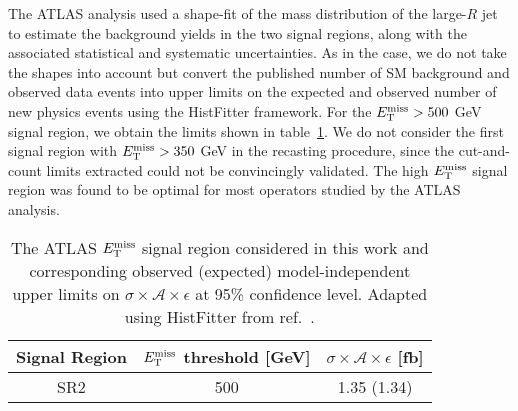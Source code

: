 The ATLAS analysis used a shape-fit of the mass distribution of the large-$R$ jet to estimate the background yields in the two signal regions, along with the associated statistical and systematic uncertainties. As in the \monoZ case, we do not take the shapes into account but convert the published number of SM background and observed data events into upper limits on the expected and observed number of new physics events using the HistFitter framework. For the $E_{\mathrm{T}}^{\mathrm{miss}} > 500$ GeV signal region, we obtain the limits shown in table~\ref{tab:sigmalim_monoWZ}. We do not consider the first signal region with $E_{\mathrm{T}}^{\mathrm{miss}} > 350$ GeV in the recasting procedure, since the cut-and-count limits extracted could not be convincingly validated. The high $E_{\mathrm{T}}^{\mathrm{miss}}$ signal region was found to be optimal for most operators studied by the ATLAS analysis.

\begin{table}[!htbp]
  \begin{center}
    \begin{tabular}{c|c|c}
      \hline
      \hline
      Signal Region & $E_{\mathrm{T}}^{\mathrm{miss}}$ threshold [GeV] & $\sigma \times \mathcal{A} \times \epsilon$ [fb] \\
      \hline
      SR2 & 500 & 1.35 (1.34) \\
      \hline
      \hline
    \end{tabular}
  \end{center}
  \caption{The ATLAS \monoWZ $E_{\mathrm{T}}^{\mathrm{miss}}$ signal region considered in this work and corresponding observed (expected) model-independent upper limits on $\sigma \times \mathcal{A} \times \epsilon$ at 95\% confidence level. Adapted using HistFitter from ref.~\cite{Aad:2013monoWZ}.}
  \label{tab:sigmalim_monoWZ}
\end{table}
